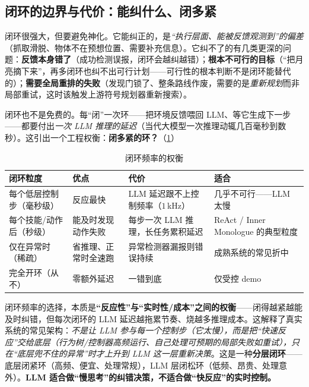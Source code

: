 \subsection{闭环的边界与代价：能纠什么、闭多紧}
\label{sec:closedloop-cost}

闭环很强大，但要避免神化。它能纠正的，是\emph{“执行层面、能被反馈观测到”的偏差}（抓取滑脱、物体不在预想位置、需要补充信息）。它纠不了的有几类更深的问题：\textbf{反馈本身错了}（成功检测误报，闭环会越纠越错）；\textbf{根本不可行的目标}（“把月亮摘下来”，再多闭环也纠不出可行计划——可行性的根本判断不是闭环能替代的）；\textbf{需要全局重排的失败}（发现门锁了、整条路线作废，需要的是\emph{重新规划}而非局部重试，这时该触发上游符号规划器重新搜索）。

闭环也不是免费的。每“闭”一次环——把环境反馈喂回 LLM、等它生成下一步——都要付出\emph{一次 LLM 推理的延迟}（当代大模型一次推理动辄几百毫秒到数秒）。这引出一个工程权衡：\textbf{闭多紧的环？}（\cref{tab:closedloop-freq}）

\begin{table}[H]\centering\small
\caption{闭环频率的权衡}
\label{tab:closedloop-freq}
\begin{tabular}{p{2.8cm}p{2.6cm}p{2.6cm}p{4.0cm}}
\toprule
闭环粒度 & 优点 & 代价 & 适合 \\
\midrule
每个低层控制步（毫秒级） & 反应最快 & LLM 延迟跟不上控制频率（$1\,$kHz） & 几乎不可行——LLM 太慢 \\
每个技能/动作后（秒级） & 能及时发现动作失败 & 每步一次 LLM 推理，长任务累积延迟 & ReAct / Inner Monologue 的典型粒度 \\
仅在异常时（稀疏） & 省推理、正常时全速跑 & 异常检测器漏报则错误持续 & 成熟系统的常见折中 \\
完全开环（从不） & 零额外延迟 & 一错到底 & 仅受控 demo \\
\bottomrule
\end{tabular}
\end{table}

\begin{insight}
闭环频率的选择，本质是\textbf{“反应性”与“实时性/成本”之间的权衡}——闭得越紧越能及时纠错，但每次闭环的 LLM 延迟越拖累节奏、烧越多推理成本。这解释了真实系统的常见架构：\emph{不是让 LLM 参与每一个控制步（它太慢），而是把“快速反应”交给底层（行为树/控制器高频运行、自己处理可预期的局部失败如重试），只在“底层兜不住的异常”时才上升到 LLM 这一层重新决策}。这是一种\textbf{分层闭环}——底层闭紧环（高频、便宜、处理常规），LLM 层闭松环（低频、昂贵、处理意外）。\textbf{LLM 适合做“慢思考”的纠错决策，不适合做“快反应”的实时控制。}
\end{insight}


